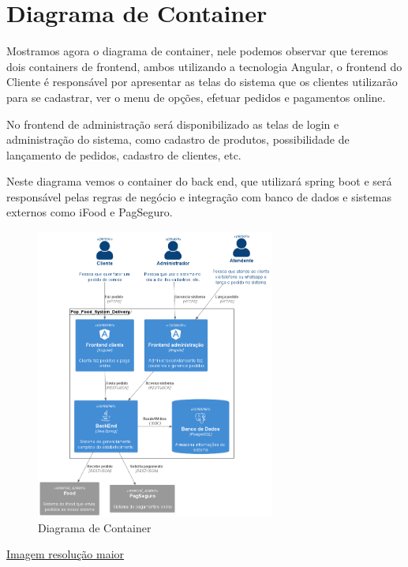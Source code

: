   \section{Diagrama de Container}
  Mostramos agora o diagrama de container, nele podemos observar que teremos dois containers de frontend,
  ambos utilizando a tecnologia Angular, o frontend do Cliente é responsável por apresentar as telas do sistema
  que os clientes utilizarão para se cadastrar, ver o menu de opções, efetuar pedidos e pagamentos online.

  No frontend de administração será disponibilizado as telas de login e administração do sistema, como cadastro de produtos, possibilidade de lançamento de pedidos,
  cadastro de clientes, etc.

  Neste diagrama vemos o container do back end, que utilizará spring boot e será responsável pelas regras de negócio e integração com banco de dados e sistemas externos como iFood e PagSeguro.

  \begin{figure}[h]
    \centering
    \includegraphics[width=0.7\textwidth]{diagrama_container.png}
    \caption{Diagrama de Container}
    \label{fig:Diagrama de Container}
  \end{figure}

  \href{https://github.com/soltein/TCC/blob/main/Diagramas/out/diagrama_container/diagrama_container.png}{Imagem resolução maior}